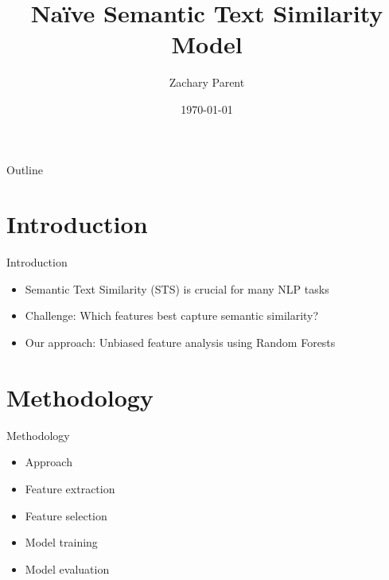 \documentclass{beamer}
\title{Naïve Semantic Text Similarity Model}
\author{Zachary Parent}
\institute{UPC}
\date{\today}
\begin{document}
\begin{frame}
    \titlepage
\end{frame}

\begin{frame}{Outline}
    \tableofcontents
\end{frame}

\section{Introduction}
\begin{frame}{Introduction}
    \begin{itemize}
        \item Semantic Text Similarity (STS) is crucial for many NLP tasks
        \item Challenge: Which features best capture semantic similarity?
        \item Our approach: Unbiased feature analysis using Random Forests
    \end{itemize}
\end{frame}

\section{Methodology}
\begin{frame}{Methodology}
    \begin{itemize}
        \item Approach
        \item Feature extraction
        \item Feature selection
        \item Model training
        \item Model evaluation
    \end{itemize}
\end{frame}
\end{document}
